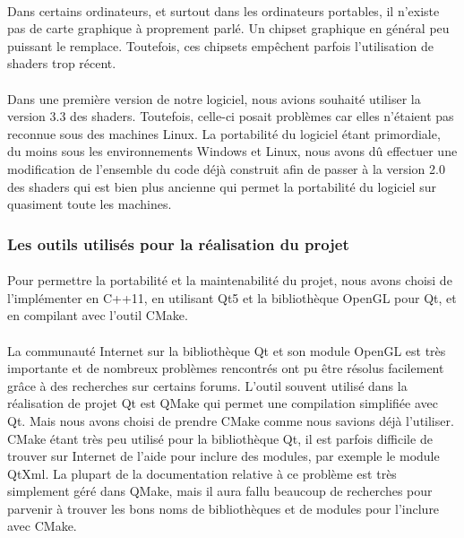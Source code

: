 \paragraph{}
Dans certains ordinateurs, et surtout dans les ordinateurs portables, il n'existe pas de carte graphique à proprement parlé. Un chipset graphique en général peu puissant le remplace. Toutefois, ces chipsets empêchent parfois l'utilisation de shaders trop récent.

\paragraph{}
Dans une première version de notre logiciel, nous avions souhaité utiliser la version 3.3 des shaders. Toutefois, celle-ci posait problèmes car elles n'étaient pas reconnue sous des machines Linux. La portabilité du logiciel étant primordiale, du moins sous les environnements Windows et Linux, nous avons dû effectuer une modification de l'ensemble du code déjà construit afin de passer à la version 2.0 des shaders qui est bien plus ancienne qui permet la portabilité du logiciel sur quasiment toute les machines.

\subsubsection{Les outils utilisés pour la réalisation du projet}
\paragraph{}
Pour permettre la portabilité et la maintenabilité du projet, nous avons choisi de l'implémenter en C++11, en utilisant Qt5 et la bibliothèque OpenGL pour Qt, et en compilant avec l'outil CMake.

\paragraph{}
La communauté Internet sur la bibliothèque Qt et son module OpenGL est très importante et de nombreux problèmes rencontrés ont pu être résolus facilement grâce à des recherches sur certains forums. 
L'outil souvent utilisé dans la réalisation de projet Qt est QMake qui permet une compilation simplifiée avec Qt. Mais nous avons choisi de prendre CMake comme nous savions déjà l'utiliser.
CMake étant très peu utilisé pour la bibliothèque Qt, il est parfois difficile de trouver sur Internet de l'aide pour inclure des modules, par exemple le module QtXml. La plupart de la documentation relative à ce problème est très simplement géré dans QMake, mais il aura fallu beaucoup de recherches pour parvenir à trouver les bons noms de bibliothèques et de modules pour l'inclure avec CMake.
